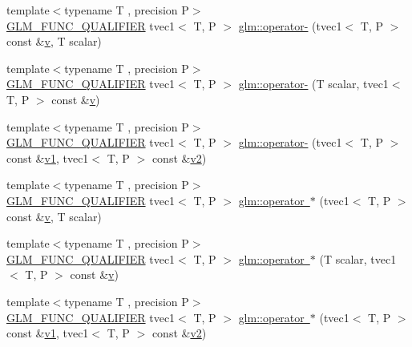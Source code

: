 \begin{DoxyCompactItemize}
\item 
{\footnotesize template$<$typename T , precision P$>$ }\\\mbox{\hyperlink{setup_8hpp_a33fdea6f91c5f834105f7415e2a64407}{G\+L\+M\+\_\+\+F\+U\+N\+C\+\_\+\+Q\+U\+A\+L\+I\+F\+I\+ER}} tvec1$<$ T, P $>$ \mbox{\hyperlink{namespaceglm_a894e196c5d37b1e34fc0ed048fd917a5}{glm\+::operator-\/}} (tvec1$<$ T, P $>$ const \&\mbox{\hyperlink{glad_8h_a14cfbe2fc2234f5504618905b69d1e06}{v}}, T scalar)
\item 
{\footnotesize template$<$typename T , precision P$>$ }\\\mbox{\hyperlink{setup_8hpp_a33fdea6f91c5f834105f7415e2a64407}{G\+L\+M\+\_\+\+F\+U\+N\+C\+\_\+\+Q\+U\+A\+L\+I\+F\+I\+ER}} tvec1$<$ T, P $>$ \mbox{\hyperlink{namespaceglm_a5c15fcefe654ab39d1db7f56b434afd6}{glm\+::operator-\/}} (T scalar, tvec1$<$ T, P $>$ const \&\mbox{\hyperlink{glad_8h_a14cfbe2fc2234f5504618905b69d1e06}{v}})
\item 
{\footnotesize template$<$typename T , precision P$>$ }\\\mbox{\hyperlink{setup_8hpp_a33fdea6f91c5f834105f7415e2a64407}{G\+L\+M\+\_\+\+F\+U\+N\+C\+\_\+\+Q\+U\+A\+L\+I\+F\+I\+ER}} tvec1$<$ T, P $>$ \mbox{\hyperlink{namespaceglm_a1c711f6ec4149bf2353559dce01d3905}{glm\+::operator-\/}} (tvec1$<$ T, P $>$ const \&\mbox{\hyperlink{glad_8h_a0779c3b73f9aa3a0ac5b0139b5d291d9}{v1}}, tvec1$<$ T, P $>$ const \&\mbox{\hyperlink{glad_8h_a9a09a1837922b2b806f4589096a52049}{v2}})
\item 
{\footnotesize template$<$typename T , precision P$>$ }\\\mbox{\hyperlink{setup_8hpp_a33fdea6f91c5f834105f7415e2a64407}{G\+L\+M\+\_\+\+F\+U\+N\+C\+\_\+\+Q\+U\+A\+L\+I\+F\+I\+ER}} tvec1$<$ T, P $>$ \mbox{\hyperlink{namespaceglm_a4c2ee7de1d33fb84e196952798d65231}{glm\+::operator $\ast$}} (tvec1$<$ T, P $>$ const \&\mbox{\hyperlink{glad_8h_a14cfbe2fc2234f5504618905b69d1e06}{v}}, T scalar)
\item 
{\footnotesize template$<$typename T , precision P$>$ }\\\mbox{\hyperlink{setup_8hpp_a33fdea6f91c5f834105f7415e2a64407}{G\+L\+M\+\_\+\+F\+U\+N\+C\+\_\+\+Q\+U\+A\+L\+I\+F\+I\+ER}} tvec1$<$ T, P $>$ \mbox{\hyperlink{namespaceglm_afbf199670869832480ddc83203d96de4}{glm\+::operator $\ast$}} (T scalar, tvec1$<$ T, P $>$ const \&\mbox{\hyperlink{glad_8h_a14cfbe2fc2234f5504618905b69d1e06}{v}})
\item 
{\footnotesize template$<$typename T , precision P$>$ }\\\mbox{\hyperlink{setup_8hpp_a33fdea6f91c5f834105f7415e2a64407}{G\+L\+M\+\_\+\+F\+U\+N\+C\+\_\+\+Q\+U\+A\+L\+I\+F\+I\+ER}} tvec1$<$ T, P $>$ \mbox{\hyperlink{namespaceglm_a566f42645da51b3398e3889c74ae2198}{glm\+::operator $\ast$}} (tvec1$<$ T, P $>$ const \&\mbox{\hyperlink{glad_8h_a0779c3b73f9aa3a0ac5b0139b5d291d9}{v1}}, tvec1$<$ T, P $>$ const \&\mbox{\hyperlink{glad_8h_a9a09a1837922b2b806f4589096a52049}{v2}})

\end{DoxyCompactItemize}
